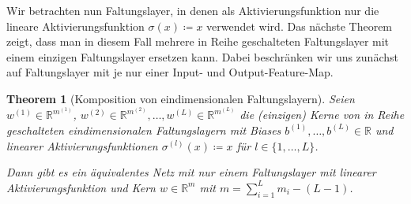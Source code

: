 \documentclass[paper=a4, 	%
		fontsize=11pt,
		abstract=true, 	%
		headsepline, 	%
		notitlepage	%
		]{scrartcl}
\newtheorem{theorem}{Theorem}[section]
\theoremstyle{definition}
\newcommand{\R}{\mathbb{R}}
\begin{document}
Wir betrachten nun Faltungslayer, in denen als Aktivierungsfunktion nur die lineare Aktivierungsfunktion $\sigma(x) \coloneqq x$ verwendet wird.
Das nächste Theorem zeigt, dass man in diesem Fall mehrere in Reihe geschalteten Faltungslayer mit einem einzigen Faltungslayer ersetzen kann.
Dabei beschränken wir uns zunächst auf Faltungslayer mit je nur einer Input- und Output-Feature-Map.

\begin{theorem}[Komposition von eindimensionalen Faltungslayern]\label{thm:matrix-collapse-linear-conv-layers}
    Seien $w^{(1)}\in\R^{m^{(1)}}$, $w^{(2)}\in\R^{m^{(2)}}, \dots, w^{(L)}\in\R^{m^{(L)}}$ die (einzigen) Kerne von in Reihe geschalteten eindimensionalen Faltungslayern mit Biases $b^{(1)},\dots, b^{(L)}\in\R$ und linearer Aktivierungsfunktionen $\sigma^{(l)}(x) \coloneqq x$ für $l\in\{1,\dots,L\}$.

    Dann gibt es ein äquivalentes Netz mit nur einem Faltungslayer mit linearer Aktivierungsfunktion und Kern $w\in\R^m$ mit $m=\sum_{i=1}^L m_i - (L-1)$.
\end{theorem}
\end{document}
